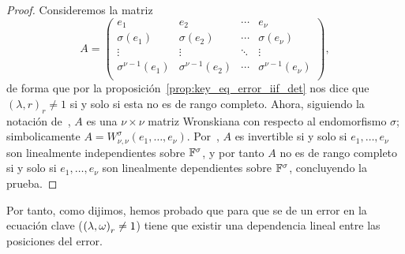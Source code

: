 \begin{proof}
Consideremos la matriz
\[
A =
\begin{pmatrix}
e_1 & e_2 & \cdots & e_{\nu} \\
\sigma(e_1) & \sigma(e_2) & \cdots & \sigma(e_{\nu}) \\
\vdots &\vdots &\ddots &\vdots \\
\sigma^{\nu-1}(e_1) & \sigma^{\nu-1}(e_2) & \cdots & \sigma^{\nu-1}(e_{\nu}) \\
\end{pmatrix}
,\]
de forma que por la proposición~\ref{prop:key_eq_error_iif_det} nos dice que \({(\lambda, r)}_r \neq 1\) si y solo si esta no es de rango completo. Ahora, siguiendo la notación de~\cite{Lam_1988}, \(A\) es una \(\nu \times \nu\) matriz Wronskiana con respecto al endomorfismo \(\sigma\); simbolicamente \(A = W_{\nu,\nu}^{\sigma}(e_1, \ldots, e_\nu)\). Por~\cite[Corolario 4.13]{Lam_1988}, \(A\) es invertible si y solo si \(e_1, \ldots, e_\nu\) son linealmente independientes sobre \(\mathbb{F}^{\sigma}\), y por tanto \(A\) no es de rango completo si y solo si \(e_1, \ldots, e_\nu\) son linealmente dependientes sobre \(\mathbb{F}^{\sigma}\), concluyendo la prueba.
\end{proof}

Por tanto, como dijimos, hemos probado que para que se de un error en la ecuación clave (\({(\lambda, \omega)}_r \neq 1\)) tiene que existir una dependencia lineal entre las posiciones del error.
